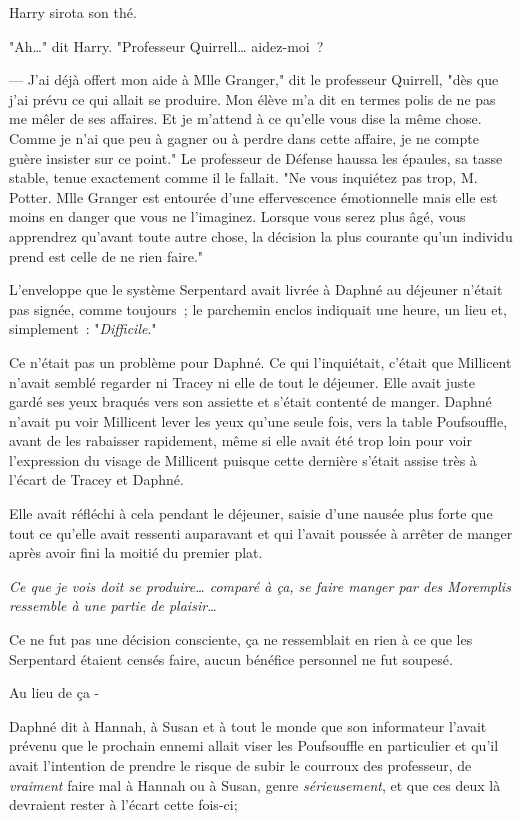 Harry sirota son thé.

"Ah…" dit Harry. "Professeur Quirrell… aidez-moi~?

--- J'ai déjà offert mon aide à Mlle Granger," dit le professeur Quirrell, "dès que j'ai prévu ce qui allait se produire. Mon élève m'a dit en termes polis de ne pas me mêler de ses affaires. Et je m'attend à ce qu'elle vous dise la même chose. Comme je n'ai que peu à gagner ou à perdre dans cette affaire, je ne compte guère insister sur ce point." Le professeur de Défense haussa les épaules, sa tasse stable, tenue exactement comme il le fallait. "Ne vous inquiétez pas trop, M. Potter. Mlle Granger est entourée d'une effervescence émotionnelle mais elle est moins en danger que vous ne l'imaginez. Lorsque vous serez plus âgé, vous apprendrez qu'avant toute autre chose, la décision la plus courante qu'un individu prend est celle de ne rien faire."

\later

L'enveloppe que le système Serpentard avait livrée à Daphné au déjeuner n'était pas signée, comme toujours~; le parchemin enclos indiquait une heure, un lieu et, simplement~: "\emph{Difficile}."

Ce n'était pas un problème pour Daphné. Ce qui l'inquiétait, c'était que Millicent n'avait semblé regarder ni Tracey ni elle de tout le déjeuner. Elle avait juste gardé ses yeux braqués vers son assiette et s'était contenté de manger. Daphné n'avait pu voir Millicent lever les yeux qu'une seule fois, vers la table Poufsouffle, avant de les rabaisser rapidement, même si elle avait été trop loin pour voir l'expression du visage de Millicent puisque cette dernière s'était assise très à l'écart de Tracey et Daphné.

Elle avait réfléchi à cela pendant le déjeuner, saisie d'une nausée plus forte que tout ce qu'elle avait ressenti auparavant et qui l'avait poussée à arrêter de manger après avoir fini la moitié du premier plat.

\emph{Ce que je vois doit se produire… comparé à ça, se faire manger par des Moremplis ressemble à une partie de plaisir…}

Ce ne fut pas une décision consciente, ça ne ressemblait en rien à ce que les Serpentard étaient censés faire, aucun bénéfice personnel ne fut soupesé.

Au lieu de ça -

Daphné dit à Hannah, à Susan et à tout le monde que son informateur l'avait prévenu que le prochain ennemi allait viser les Poufsouffle en particulier et qu'il avait l'intention de prendre le risque de subir le courroux des professeur, de \emph{vraiment} faire mal à Hannah ou à Susan, genre \emph{sérieusement}, et que ces deux là devraient rester à l'écart cette fois-ci;

